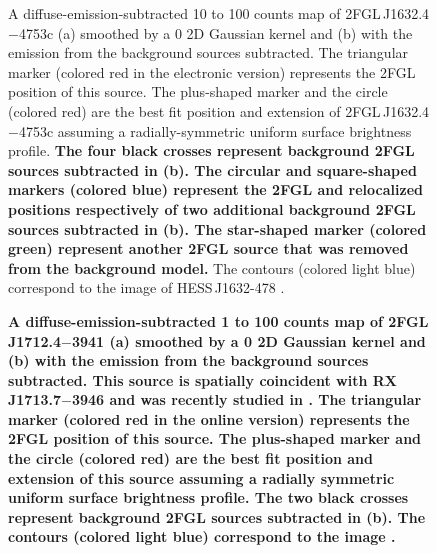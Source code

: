 \documentclass[12pt,preprint]{aastex}
\newif\ifcolorfigure
\newcommand{\gev}{\text{GeV}\xspace}
\newcommand{\tev}{\text{TeV}\xspace}
\newcommand{\newtext}[1]{{\bfseries \color{red}#1}}
\begin{document}
\begin{figure}
    \ifcolorfigure
      \plotone{source_plots/source_HESS_J1632-478_color.eps}
    \else
    \fi
  \caption{
  A diffuse-emission-subtracted 10 \gev to 100 \gev counts map of
  2FGL\,J1632.4$-$4753c (a) smoothed by a 0 2D Gaussian
  kernel and (b) with the emission from the background sources subtracted.  
  The triangular marker (colored red in the electronic version)
  represents the 2FGL position of this source.  The plus-shaped marker
  and the circle (colored red) are the best fit position and extension of
  2FGL\,J1632.4$-$4753c assuming a radially-symmetric uniform surface
  brightness profile.  
  \newtext{
  The four black crosses represent background 2FGL
  sources subtracted in (b).  The 
  circular and square-shaped markers (colored blue) represent 
  the 2FGL and relocalized positions respectively of two
  additional background 2FGL sources subtracted in (b).
  The star-shaped marker (colored green) represent another 2FGL
  source that was removed from the background model.  
  }
  The contours (colored light blue) correspond to the \tev image of
  HESS\,J1632-478 \citep{hess_plane_survey}.
  }\label{1FGL_J1632.9-4802c}
\end{figure}

\begin{figure}
    \ifcolorfigure
      \plotone{source_plots/source_RX_J1713.7-3946_color.eps}
    \else
    \fi
  \caption{
  \newtext{
  A diffuse-emission-subtracted 1 \gev to 100 \gev counts map
  of 2FGL\,J1712.4$-$3941 (a) smoothed by a 0\fdg15 2D
  Gaussian kernel and (b) with the emission from the background sources
  subtracted.  This source is spatially coincident with RX\,J1713.7$-$3946
  and was recently studied in \cite{rx_j1713_lat}.  The triangular marker
  (colored red in the online version) represents the 2FGL position of
  this source.  The plus-shaped marker and the circle (colored red) are
  the best fit position and extension of this source assuming a radially
  symmetric uniform surface brightness profile.  
  The two black crosses represent background 2FGL sources subtracted in (b).
  The contours (colored light blue)
  correspond to the \tev image \citep{rx_j1713_hess}.  
  }
  }\label{2FGL_J1712.4-3941}
\end{figure}
\end{document}
